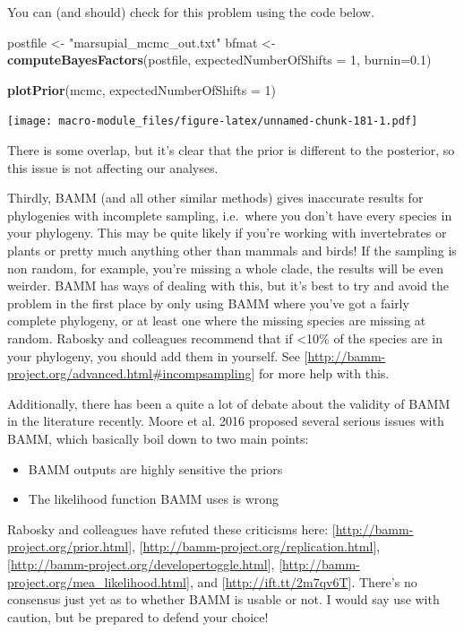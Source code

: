 \documentclass[]{book}
\newenvironment{Shaded}{\begin{snugshade}}{\end{snugshade}}
\newcommand{\KeywordTok}[1]{\textcolor[rgb]{0.13,0.29,0.53}{\textbf{{#1}}}}
\newcommand{\DataTypeTok}[1]{\textcolor[rgb]{0.13,0.29,0.53}{{#1}}}
\newcommand{\DecValTok}[1]{\textcolor[rgb]{0.00,0.00,0.81}{{#1}}}
\newcommand{\FloatTok}[1]{\textcolor[rgb]{0.00,0.00,0.81}{{#1}}}
\newcommand{\StringTok}[1]{\textcolor[rgb]{0.31,0.60,0.02}{{#1}}}
\newcommand{\NormalTok}[1]{{#1}}
\providecommand{\tightlist}{%
  \setlength{\itemsep}{0pt}\setlength{\parskip}{0pt}}
\begin{document}
You can (and should) check for this problem using the code below.

\begin{Shaded}
\begin{Highlighting}[]
\NormalTok{postfile <-}\StringTok{ "marsupial_mcmc_out.txt"}
\NormalTok{bfmat <-}\StringTok{ }\KeywordTok{computeBayesFactors}\NormalTok{(postfile, }\DataTypeTok{expectedNumberOfShifts =} \DecValTok{1}\NormalTok{, }\DataTypeTok{burnin=}\FloatTok{0.1}\NormalTok{)}

\KeywordTok{plotPrior}\NormalTok{(mcmc, }\DataTypeTok{expectedNumberOfShifts =} \DecValTok{1}\NormalTok{)}
\end{Highlighting}
\end{Shaded}

\texttt{[image: macro-module\_files/figure-latex/unnamed-chunk-181-1.pdf]}

There is some overlap, but it's clear that the prior is different to the
posterior, so this issue is not affecting our analyses.

Thirdly, BAMM (and all other similar methods) gives inaccurate results
for phylogenies with incomplete sampling, i.e.~where you don't have
every species in your phylogeny. This may be quite likely if you're
working with invertebrates or plants or pretty much anything other than
mammals and birds! If the sampling is non random, for example, you're
missing a whole clade, the results will be even weirder. BAMM has ways
of dealing with this, but it's best to try and avoid the problem in the
first place by only using BAMM where you've got a fairly complete
phylogeny, or at least one where the missing species are missing at
random. Rabosky and colleagues recommend that if \textless{}10\% of the
species are in your phylogeny, you should add them in yourself. See
{[}\url{http://bamm-project.org/advanced.html\#incompsampling}{]} for
more help with this.

Additionally, there has been a quite a lot of debate about the validity
of BAMM in the literature recently. Moore et al. 2016 proposed several
serious issues with BAMM, which basically boil down to two main points:

\begin{itemize}
\tightlist
\item
  BAMM outputs are highly sensitive the priors
\item
  The likelihood function BAMM uses is wrong
\end{itemize}

Rabosky and colleagues have refuted these criticisms here:
{[}\url{http://bamm-project.org/prior.html}{]},
{[}\url{http://bamm-project.org/replication.html}{]},
{[}\url{http://bamm-project.org/developertoggle.html}{]},
{[}\url{http://bamm-project.org/mea_likelihood.html}{]}, and
{[}\url{http://ift.tt/2m7qv6T}{]}. There's no consensus just yet as to
whether BAMM is usable or not. I would say use with caution, but be
prepared to defend your choice!
\end{document}
